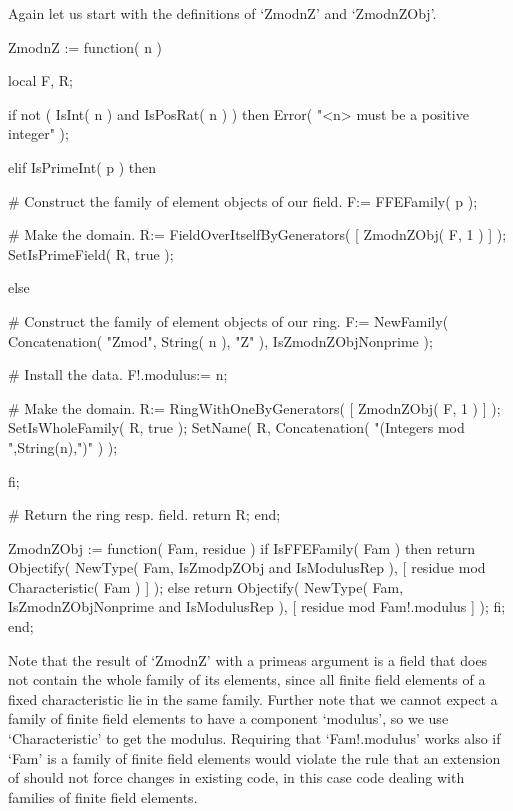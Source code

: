 Again let us start with the definitions of `ZmodnZ' and `ZmodnZObj'.

\beginexample
    ZmodnZ := function( n )

        local F, R;

        if not ( IsInt( n ) and IsPosRat( n ) ) then
          Error( "<n> must be a positive integer" );

        elif IsPrimeInt( p ) then

          # Construct the family of element objects of our field.
          F:= FFEFamily( p );

          # Make the domain.
          R:= FieldOverItselfByGenerators( [ ZmodnZObj( F, 1 ) ] );
          SetIsPrimeField( R, true );

        else

          # Construct the family of element objects of our ring.
          F:= NewFamily( Concatenation( "Zmod", String( n ), "Z" ),
                         IsZmodnZObjNonprime );
  
          # Install the data.
          F!.modulus:= n;
  
          # Make the domain.
          R:= RingWithOneByGenerators( [ ZmodnZObj( F, 1 ) ] );
          SetIsWholeFamily( R, true );
          SetName( R, Concatenation( "(Integers mod ",String(n),")" ) );

        fi;

        # Return the ring resp. field.
        return R;
    end;


    ZmodnZObj := function( Fam, residue )
    if IsFFEFamily( Fam ) then
      return Objectify( NewType( Fam,     IsZmodpZObj
                                      and IsModulusRep ),
                        [ residue mod Characteristic( Fam ) ] );
    else
      return Objectify( NewType( Fam,     IsZmodnZObjNonprime
                                      and IsModulusRep ),
                        [ residue mod Fam!.modulus ] );
    fi;
    end;
\endexample

Note that the result of `ZmodnZ' with a primeas argument is a field that
does not contain the whole family of its elements, since all finite field
elements of a fixed characteristic lie in the same family.
Further note that we cannot expect a family of finite field elements
to have a component `modulus',
so we use `Characteristic' to get the modulus.
Requiring that `Fam!.modulus' works also if `Fam' is a family of
finite field elements would violate the rule
that an extension of {\GAP} should not force changes in existing code,
in this case code dealing with families of finite field elements.

